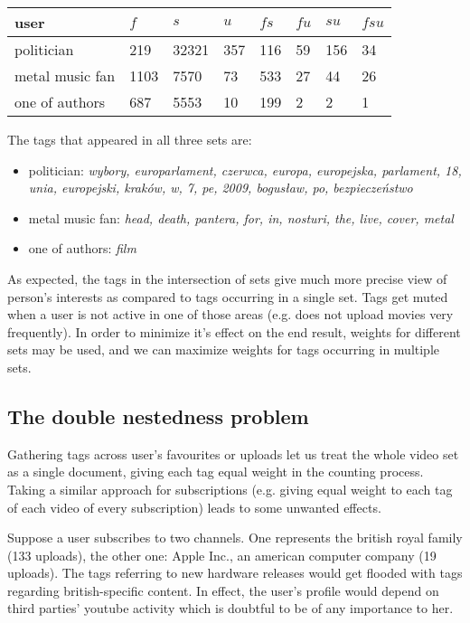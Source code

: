 \begin{tabular}{| l | l | l | l | l | l | l | l |}
user & $f$ & $s$ & $u$ & $fs$ & $fu$ & $su$ & $fsu$ \\ \hline
politician & 219 & 32321 & 357 & 116 & 59 & 156 & 34 \\
metal music fan & 1103 & 7570 & 73 & 533 & 27 & 44 & 26 \\
one of authors & 687 & 5553 & 10 & 199 & 2 & 2 & 1 \\
\end{tabular}

The tags that appeared in all three sets are:
\begin{itemize}
  \item{politician: \emph{wybory, europarlament, czerwca, europa, europejska,
  parlament, 18, unia, europejski, kraków, w, 7, pe, 2009, bogusław, po,
  bezpieczeństwo}}
  \item{metal music fan: \emph{head, death, pantera, for, in, nosturi, the, live, cover, metal}}
  \item{one of authors: \emph{film}}
\end{itemize}

As expected, the tags in the intersection of sets give much more precise view of person's
interests as compared to tags occurring in a single set. Tags get muted when a user is not active in one of
those areas (e.g. does not upload movies very frequently). In order to minimize it's effect on the
end result, weights for different sets may be used, and we can maximize weights for tags occurring
in multiple sets.

\subsection{The double nestedness problem}
Gathering tags across user's favourites or uploads let us treat the whole video
set as a single document, giving each tag equal weight in the counting process.
Taking a similar approach for subscriptions (e.g. giving equal weight to each
tag of each video of every subscription) leads to some unwanted effects.

Suppose a user subscribes to two channels. One represents the british royal
family (133 uploads), the other one: Apple Inc., an american computer company
(19 uploads). The tags referring to new hardware releases would get flooded with
tags regarding british-specific content. In effect, the user's profile would
depend on third parties' youtube activity which is doubtful to be of any
importance to her.


